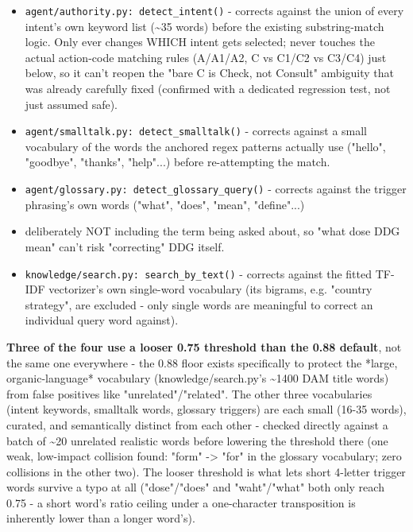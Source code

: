 \begin{itemize}
\item \texttt{agent/\allowbreak{}authority.py: detect\_\allowbreak{}intent()} - corrects against the union of every intent's own keyword list (\textasciitilde{}35 words) before the existing substring-match logic. Only ever changes WHICH intent gets selected; never touches the actual action-code matching rules (A/A1/A2, C vs C1/C2 vs C3/C4) just below, so it can't reopen the "bare C is Check, not Consult" ambiguity that was already carefully fixed (confirmed with a dedicated regression test, not just assumed safe).
\item \texttt{agent/\allowbreak{}smalltalk.py: detect\_\allowbreak{}smalltalk()} - corrects against a small vocabulary of the words the anchored regex patterns actually use ("hello", "goodbye", "thanks", "help"...) before re-attempting the match.
\item \texttt{agent/\allowbreak{}glossary.py: detect\_\allowbreak{}glossary\_\allowbreak{}query()} - corrects against the trigger phrasing's own words ("what", "does", "mean", "define"...)
\item deliberately NOT including the term being asked about, so "what dose DDG mean" can't risk "correcting" DDG itself.
\item \texttt{knowledge/\allowbreak{}search.py: search\_\allowbreak{}by\_\allowbreak{}text()} - corrects against the fitted TF-IDF vectorizer's own single-word vocabulary (its bigrams, e.g. "country strategy", are excluded - only single words are meaningful to correct an individual query word against).
\end{itemize}
\textbf{Three of the four use a looser 0.75 threshold than the 0.88 default}, not the same one everywhere - the 0.88 floor exists specifically to protect the *large, organic-language* vocabulary (knowledge/search.py's \textasciitilde{}1400 DAM title words) from false positives like "unrelated"/"related". The other three vocabularies (intent keywords, smalltalk words, glossary triggers) are each small (16-35 words), curated, and semantically distinct from each other - checked directly against a batch of \textasciitilde{}20 unrelated realistic words before lowering the threshold there (one weak, low-impact collision found: "form" -> "for" in the glossary vocabulary; zero collisions in the other two). The looser threshold is what lets short 4-letter trigger words survive a typo at all ("dose"/"does" and "waht"/"what" both only reach 0.75 - a short word's ratio ceiling under a one-character transposition is inherently lower than a longer word's).

